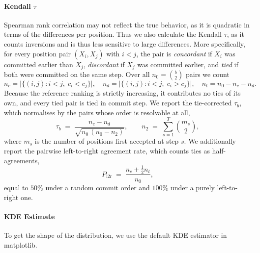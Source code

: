 \paragraph{Kendall $\tau$}
Spearman rank correlation may not reflect the true behavior, as it is
quadratic in terms of the differences per position. Thus we also calculate
the Kendall $\tau$, as it counts inversions and is thus less sensitive to
large differences. More specifically, for every position pair $(X_i, X_j)$
with $i < j$, the pair is \emph{concordant} if $X_i$ was committed earlier
than $X_j$, \emph{discordant} if $X_j$ was committed earlier, and
\emph{tied} if both were committed on the same step. Over all
$n_0 = \binom{b}{2}$ pairs we count
\begin{equation}
  n_c = \bigl|\{(i,j) : i<j,\; c_i < c_j\}\bigr|, \quad
  n_d = \bigl|\{(i,j) : i<j,\; c_i > c_j\}\bigr|, \quad
  n_t = n_0 - n_c - n_d .
\end{equation}
Because the reference ranking is strictly increasing, it contributes no
ties of its own, and every tied pair is tied in commit step. We report the
tie-corrected $\tau_b$, which normalises by the pairs whose order is
resolvable at all,
\begin{equation}
  \tau_b \;=\; \frac{n_c - n_d}{\sqrt{n_0\,(n_0 - n_2)}},
  \qquad
  n_2 \;=\; \sum_{s=1}^{T} \binom{m_s}{2},
\end{equation}
where $m_s$ is the number of positions first accepted at step $s$. We
additionally report the pairwise left-to-right agreement rate, which counts
ties as half-agreements,
\begin{equation}
  P_{\mathrm{l2r}} \;=\; \frac{n_c + \tfrac{1}{2} n_t}{n_0},
\end{equation}
equal to $50\%$ under a random commit order and $100\%$ under a purely
left-to-right one.

\paragraph{KDE Estimate}
To get the shape of the distribution, we use the default KDE estimator in matplotlib. 

% 
% 
% 